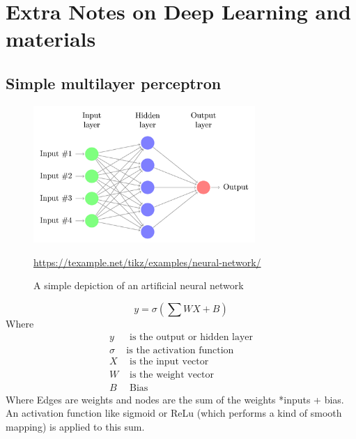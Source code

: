 

\chapter{Extra Notes on Deep Learning and materials} %

\label{AppendixA} %

\section{Simple multilayer perceptron}

\begin{figure}[h]
	\includegraphics[width=0.75\textwidth]{../Figures/neural-network.png}
	\caption[An ANN]{A simple depiction of an artificial neural network} \url{https://texample.net/tikz/examples/neural-network/}
\label{fig:appendix-mlp}
\end{figure}

\begin{equation*}
	y =  \sigma\left(\sum WX + B\right)
\end{equation*}
Where
\begin{align*}
	y &  \text{ is the output or hidden layer} \\
	\sigma &  \text{is the activation function} \\
	X &  \text{ is the input vector} \\
	W &  \text{ is the weight vector} \\
	B &  \text{ Bias}
\end{align*}
Where Edges are weights and nodes are the sum of the weights *inputs + bias. An activation function like sigmoid or ReLu (which performs a kind of smooth mapping) is applied to this sum.

